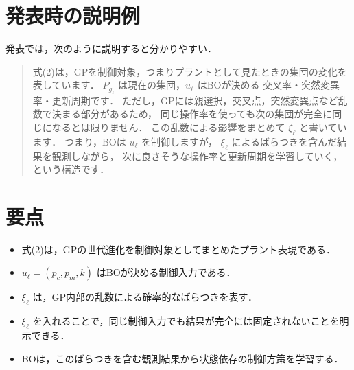 \documentclass[a4paper,11pt]{ltjsarticle}
\begin{document}
\section{発表時の説明例}

発表では，次のように説明すると分かりやすい．

\begin{quote}
式(2)は，GPを制御対象，つまりプラントとして見たときの集団の変化を表しています．
\(P_{g_\ell}\) は現在の集団，\(u_\ell\) はBOが決める
交叉率・突然変異率・更新周期です．
ただし，GPには親選択，交叉点，突然変異点など乱数で決まる部分があるため，
同じ操作率を使っても次の集団が完全に同じになるとは限りません．
この乱数による影響をまとめて \(\xi_\ell\) と書いています．
つまり，BOは \(u_\ell\) を制御しますが，
\(\xi_\ell\) によるばらつきを含んだ結果を観測しながら，
次に良さそうな操作率と更新周期を学習していく，という構造です．
\end{quote}

\section{要点}

\begin{itemize}
  \item 式(2)は，GPの世代進化を制御対象としてまとめたプラント表現である．
  \item \(u_\ell=(p_c,p_m,k)\) はBOが決める制御入力である．
  \item \(\xi_\ell\) は，GP内部の乱数による確率的なばらつきを表す．
  \item \(\xi_\ell\) を入れることで，同じ制御入力でも結果が完全には固定されないことを明示できる．
  \item BOは，このばらつきを含む観測結果から状態依存の制御方策を学習する．
\end{itemize}
\end{document}
